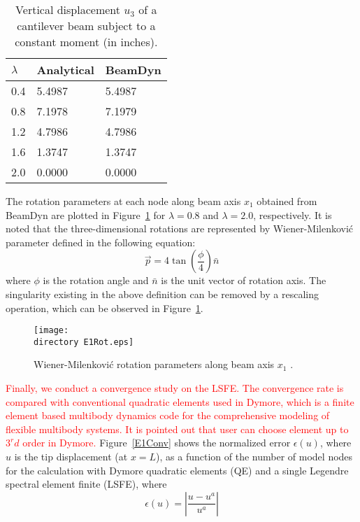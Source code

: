 \begin{table}[tbp]
\centering 
\caption{Vertical displacement $u_3$ of a cantilever beam subject to a constant moment (in inches).}
\label{E1u3} 
	\begin{tabular}{| l | l | l | }
    	\hline
    	$\lambda$ & Analytical & BeamDyn  \\ \hline
    	0.4       & 5.4987     & 5.4987   \\ \hline
    	0.8       & 7.1978     & 7.1979   \\ \hline
    	1.2       & 4.7986     & 4.7986   \\ \hline
    	1.6       & 1.3747     & 1.3747   \\ \hline
    	2.0       & 0.0000     & 0.0000   \\ \hline
    \end{tabular}
 \end{table}
 The rotation parameters at each node along beam axis $x_1$ obtained from BeamDyn are plotted in Figure~\ref{E1Rot} for $\lambda = 0.8$ and $\lambda = 2.0$, respectively. It is noted that the three-dimensional rotations are represented by Wiener-Milenkovi\'c parameter defined in the following equation:
 \begin{equation}
     \vec{p} = 4 \tan\left(\frac{\phi}{4} \right) \bar{n} 
     \label{WMParameter}
 \end{equation}
 where $\phi$ is the rotation angle and $\bar{n}$ is the unit vector of rotation axis. The singularity existing in the above definition can be removed by a rescaling operation, which can be observed in Figure~\ref{E1Rot}.
\begin{figure}
    \centering
    \texttt{[image: \\directory E1Rot.eps]}
    \caption{Wiener-Milenkovi\'c rotation parameters along beam axis $x_1$ .}
    \label{E1Rot}
\end{figure}
\textcolor{red}{Finally, we conduct a convergence study on the LSFE. The convergence rate is compared with conventional quadratic elements used in Dymore, which is a finite element based multibody dynamics code for the comprehensive modeling of flexible multibody systems. It is pointed out that user can choose element up to $3^rd$ order in Dymore.} Figure~\ref{E1Conv} shows the normalized error $\epsilon(u)$, where $u$ is
the tip displacement (at $x=L$), as a function of the number of model nodes
for the calculation with Dymore quadratic elements (QE) and a single
Legendre spectral element finite (LSFE), where
\begin{equation}
    \label{E1Error}
    \epsilon(u) = \left| \frac{u-u^a}{u^a} \right|
\end{equation}

